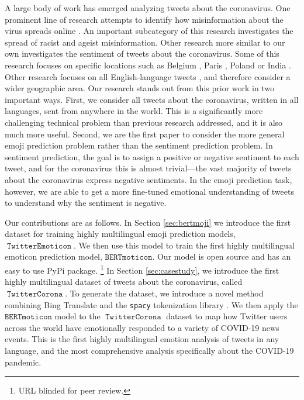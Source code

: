 \documentclass[11pt]{article}
\newcommand{\bertmoji}{\texttt{BERTmoticon}}
\DeclareMathOperator{\emoticon}{\texttt{TwitterEmoticon}}
\DeclareMathOperator{\corona}{\texttt{TwitterCorona}}
\begin{document}
A large body of work has emerged analyzing tweets about the coronavirus.
One prominent line of research attempts to identify how misinformation about the virus spreads online \citep{kouzy2020coronavirus,sharma2020coronavirus,yang2020prevalence,elhadad2020covid,prabhakar2020informational}.
An important subcategory of this research investigates the spread of racist \citep{budhwani2020creating,schild2020go} and ageist \citep{jimenez2020coronavirus} misinformation.
Other research more similar to our own investigates the sentiment of tweets about the coronavirus.
Some of this research focuses on specific locations such as Belgium \citep{kurten2020coronavirus}, Paris \citep{saire2020study}, Poland \citep{jarynowski2020perception} or India \citep{subasish2020}.
Other research focuses on all English-language tweets \citep{rajput2020word,yin2020detecting},
and therefore consider a wider geographic area.
Our research stands out from this prior work in two important ways.
First, we consider all tweets about the coronavirus, written in all languages, sent from anywhere in the world.
This is a significantly more challenging technical problem than previous research addressed,
and it is also much more useful.
Second, we are the first paper to consider the more general emoji prediction problem rather than the sentiment prediction problem.
In sentiment prediction,
the goal is to assign a positive or negative sentiment to each tweet,
and for the coronavirus this is almost trivial---the vast majority of tweets about the coronavirus express negative sentiments.
In the emoji prediction task, however, we are able to get a more fine-tuned emotional understanding of tweets to understand why the sentiment is negative.


Our contributions are as follows.
In Section \ref{sec:bertmoji} we introduce the first dataset for training highly multilingual emoji prediction models, $\emoticon$.
We then use this model to train the first highly multilingual emoticon prediction model, $\bertmoji$.
Our model is open source and has an easy to use PyPi package.%
\footnote{
    URL blinded for peer review.
}
In Section \ref{sec:casestudy}, we introduce the first highly multilingual dataset of tweets about the coronavirus, called $\corona$.
To generate the dataset, we introduce a novel method combining Bing Translate and the \texttt{spacy} tokenization library \citep{spacy2}.
We then apply the $\bertmoji$ model to the $\corona$ dataset to map how Twitter users across the world have emotionally responded to a variety of COVID-19 news events.
This is the first highly multilingual emotion analysis of tweets in any language,
and the most comprehensive analysis specifically about the COVID-19 pandemic.
\end{document}
